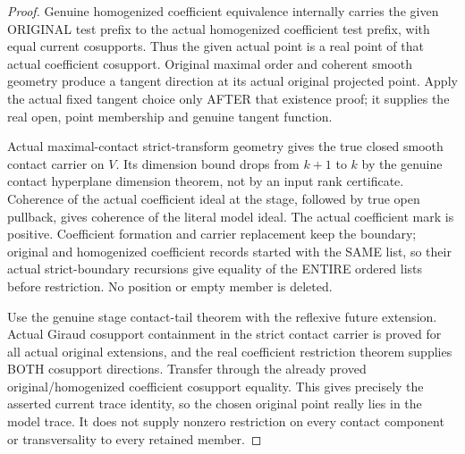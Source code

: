 \begin{proof}
Genuine homogenized coefficient equivalence internally carries the given
ORIGINAL test prefix to the actual homogenized coefficient test prefix,
with equal current cosupports. Thus the given actual point is a real
point of that actual coefficient cosupport. Original maximal order and
coherent smooth geometry produce a tangent direction at its actual
original projected point. Apply the actual fixed tangent choice only
AFTER that existence proof; it supplies the real open, point membership
and genuine tangent function.

Actual maximal-contact strict-transform geometry gives the true closed
smooth contact carrier on $V$. Its dimension bound drops from $k+1$ to
$k$ by the genuine contact hyperplane dimension theorem, not by an input
rank certificate. Coherence of the actual coefficient ideal at the stage,
followed by true open pullback, gives coherence of the literal model ideal.
The actual coefficient mark is positive. Coefficient formation and carrier
replacement keep the boundary; original and homogenized coefficient
records started with the SAME list, so their actual strict-boundary
recursions give equality of the ENTIRE ordered lists before restriction.
No position or empty member is deleted.

Use the genuine stage contact-tail theorem with the reflexive future
extension. Actual Giraud cosupport containment in the strict contact
carrier is proved for all actual original extensions, and the real
coefficient restriction theorem supplies BOTH cosupport directions.
Transfer through the already proved original/homogenized coefficient
cosupport equality. This gives precisely the asserted current trace
identity, so the chosen original point really lies in the model trace.
It does not supply nonzero restriction on every contact component or
transversality to every retained member.
\end{proof}

